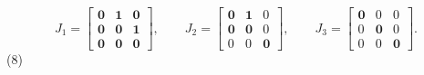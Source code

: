 \[J_{1}=\begin{bmatrix}\mathbf{0}&\mathbf{1}&\mathbf{0}\\ \mathbf{0}&\mathbf{0}&\mathbf{1}\\ \mathbf{0}&\mathbf{0}&\mathbf{0}\end{bmatrix},\qquad J_{2}=\begin{bmatrix} \mathbf{0}&\mathbf{1}&0\\ \mathbf{0}&\mathbf{0}&0\\ 0&0&\mathbf{0}\end{bmatrix},\qquad J_{3}=\begin{bmatrix}\mathbf{0}&0&0\\ 0&\mathbf{0}&0\\ 0&0&\mathbf{0}\end{bmatrix}.\] (8) 